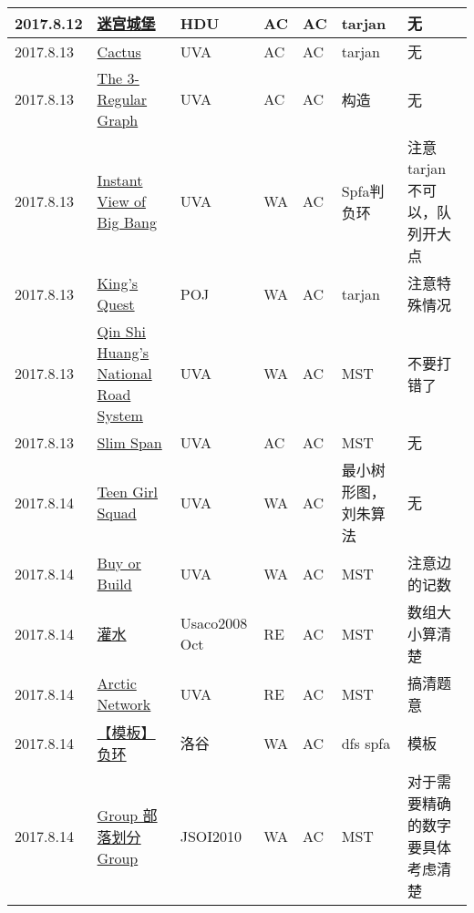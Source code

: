 \documentclass[a4paper]{article}
\begin{document}
\begin{longtable}{|p{1.5cm}|p{2.5cm}|p{1.6cm}|p{1.6cm}|p{1cm}|p{3cm}|p{4cm}|}
		\hline
		2017.8.12 & \href {https://vjudge.net/problem/HDU-1269}{迷宫城堡}
		 & HDU & AC & AC & tarjan & 无\\
		
		\hline
		2017.8.13 & \href {https://vjudge.net/problem/UVA-10510}{Cactus}
		 & UVA & AC & AC & tarjan & 无\\
		
		\hline
		2017.8.13 & \href {https://vjudge.net/problem/UVA-11387}{The 3-Regular Graph}
		 & UVA & AC & AC & 构造 & 无\\
		
		\hline
		2017.8.13 & \href {https://vjudge.net/problem/UVA-11721}{Instant View of Big Bang}
		 & UVA & WA & AC & Spfa判负环 & 注意tarjan不可以，队列开大点\\
		
		\hline
		2017.8.13 & \href {https://vjudge.net/problem/POJ-1904}{King's Quest}
		 & POJ & WA & AC & tarjan & 注意特殊情况\\
		
		\hline
		2017.8.13 & \href {https://vjudge.net/problem/UVALive-5713}{Qin Shi Huang's National Road System}
		 & UVA & WA & AC & MST & 不要打错了\\
		
		\hline
		2017.8.13 & \href {https://vjudge.net/problem/UVA-1395}{Slim Span}
		 & UVA & AC & AC & MST & 无\\
		
		\hline
		2017.8.14 & \href {https://vjudge.net/problem/UVA-11183}{Teen Girl Squad}
		 & UVA & WA & AC & 最小树形图，刘朱算法 & 无\\
		
		\hline
		2017.8.14 & \href {https://vjudge.net/problem/UVA-1151}{Buy or Build}
		 & UVA & WA & AC & MST & 注意边的记数\\
		
		\hline
		2017.8.14 & \href{http://www.lydsy.com:808/JudgeOnline/problem.php?id=1601}{灌水}
		 & Usaco2008 Oct & RE & AC & MST & 数组大小算清楚\\
		
		\hline
		2017.8.14 & \href {https://vjudge.net/problem/UVA-10369}{Arctic Network}
		 & UVA & RE & AC & MST & 搞清题意\\
		
		\hline
		2017.8.14 & \href {https://www.luogu.org/problem/show?pid=3385}{【模板】负环}
		 & 洛谷 & WA & AC & dfs spfa & 模板\\
		
		\hline
		2017.8.14 & \href {http://www.lydsy.com/JudgeOnline/problem.php?id=1821}{Group 部落划分 Group}
		 & JSOI2010 & WA & AC & MST & 对于需要精确的数字要具体考虑清楚\\
		

\end{longtable}
\end{document}
